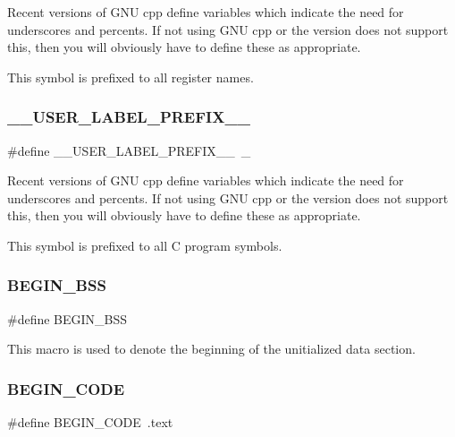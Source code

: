 Recent versions of G\+NU cpp define variables which indicate the need for underscores and percents. If not using G\+NU cpp or the version does not support this, then you will obviously have to define these as appropriate.

This symbol is prefixed to all register names. \mbox{\label{group__RTEMSScoreCPUlm32ASM_gaff6bf0ff0fa3b5cbd23a8ae1131c87a9}} 
\subsubsection{\texorpdfstring{\_\_USER\_LABEL\_PREFIX\_\_}{\_\_USER\_LABEL\_PREFIX\_\_}}
{\footnotesize\ttfamily \#define \+\_\+\+\_\+\+U\+S\+E\+R\+\_\+\+L\+A\+B\+E\+L\+\_\+\+P\+R\+E\+F\+I\+X\+\_\+\+\_\+~\+\_\+}

Recent versions of G\+NU cpp define variables which indicate the need for underscores and percents. If not using G\+NU cpp or the version does not support this, then you will obviously have to define these as appropriate.

This symbol is prefixed to all C program symbols. \mbox{\label{group__RTEMSScoreCPUlm32ASM_ga50f110f0489e48ceda4a0473a35d2978}} 
\subsubsection{\texorpdfstring{BEGIN\_BSS}{BEGIN\_BSS}}
{\footnotesize\ttfamily \#define B\+E\+G\+I\+N\+\_\+\+B\+SS}

This macro is used to denote the beginning of the unitialized data section. \mbox{\label{group__RTEMSScoreCPUlm32ASM_ga6d6dc213aff5b736968e2aff37eb2c99}} 
\subsubsection{\texorpdfstring{BEGIN\_CODE}{BEGIN\_CODE}}
{\footnotesize\ttfamily \#define B\+E\+G\+I\+N\+\_\+\+C\+O\+DE~.text}

